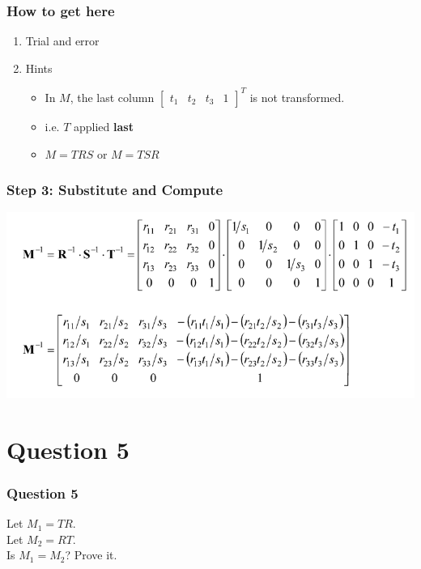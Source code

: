 \documentclass{beamer}
\begin{document}
\begin{frame}
    \frametitle{How to get here}

    \begin{enumerate}
        \item Trial and error
        \item Hints
        \begin{itemize}
            \item In $M$, the last column $[\begin{matrix}t_1 & t_2 & t_3 & 1\end{matrix}]^T$ is not transformed.
            \item i.e. $T$ applied \textbf{last}
            \item $M = TRS$ or $M = TSR$
        \end{itemize}
    \end{enumerate}

\end{frame}

\begin{frame}
    \frametitle{Step 3: Substitute and Compute}

    \begin{center}
        \includegraphics[scale=0.6]{q4.png}
    \end{center}

\end{frame}

\section{Question 5}

\begin{frame}
    \frametitle{Question 5}
    
    Let $M_1 = TR$. \\
    Let $M_2 = RT$. \\
    Is $M_1 = M_2$? Prove it.

\end{frame}
\end{document}
